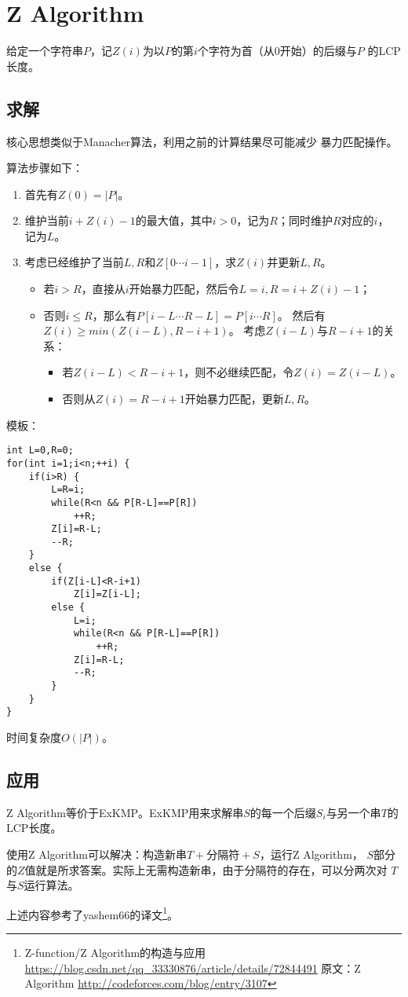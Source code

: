 \section{Z Algorithm}
\label{ZA}
给定一个字符串$P$，记$Z(i)$为以$P$的第$i$个字符为首（从0开始）的后缀与$P$
的LCP长度。
\subsection{求解}
核心思想类似于Manacher算法，利用之前的计算结果尽可能减少
暴力匹配操作。

算法步骤如下：
\begin{enumerate}
    \item 首先有$Z(0)=|P|$。
    \item 维护当前$i+Z(i)-1$的最大值，其中$i>0$，记为$R$；同时维护$R$对应的$i$，
    记为$L$。
    \item 考虑已经维护了当前$L,R$和$Z[0\cdots i-1]$，求$Z(i)$并更新$L,R$。
    \begin{itemize}
        \item 若$i>R$，直接从$i$开始暴力匹配，然后令$L=i,R=i+Z(i)-1$；
        \item 否则$i\leq R$，那么有$P[i-L\cdots R-L]=P[i\cdots R]$。
        然后有$Z(i)\geq min(Z(i-L),R-i+1)$。
        考虑$Z(i-L)$与$R-i+1$的关系：
        \begin{itemize}
            \item 若$Z(i-L)<R-i+1$，则不必继续匹配，令$Z(i)=Z(i-L)$。
            \item 否则从$Z(i)=R-i+1$开始暴力匹配，更新$L,R$。
        \end{itemize}
    \end{itemize}
\end{enumerate}

模板：
\begin{lstlisting}
int L=0,R=0;
for(int i=1;i<n;++i) {
    if(i>R) {
        L=R=i;
        while(R<n && P[R-L]==P[R])
            ++R;
        Z[i]=R-L;
        --R;
    }
    else {
        if(Z[i-L]<R-i+1)
            Z[i]=Z[i-L];
        else {
            L=i;
            while(R<n && P[R-L]==P[R])
                ++R;
            Z[i]=R-L;
            --R;
        }
    }
}
\end{lstlisting}

时间复杂度$O(|P|)$。
\subsection{应用}
Z Algorithm等价于ExKMP。ExKMP用来求解串$S$的每一个后缀$S_i$与另一个串$T$的
LCP长度。

使用Z Algorithm可以解决：构造新串$T+\mathrm{分隔符}+S$，运行Z Algorithm，
$S$部分的$Z$值就是所求答案。实际上无需构造新串，由于分隔符的存在，可以分两次对
$T$与$S$运行算法。

上述内容参考了yashem66的译文\footnote{
    Z-function/Z Algorithm的构造与应用
    \url{https://blog.csdn.net/qq\_33330876/article/details/72844491}
    原文：Z Algorithm
    \url{http://codeforces.com/blog/entry/3107}
}。
